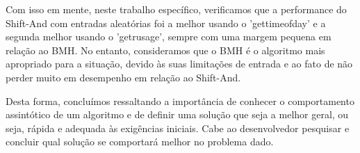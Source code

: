 \documentclass[12pt]{article}
\begin{document}
        Com isso em mente, neste trabalho específico, verificamos que a performance do Shift-And com entradas aleatórias foi a melhor usando o 
        'gettimeofday' e a segunda melhor usando o 'getrusage', sempre com uma margem pequena em relação ao BMH. No entanto, consideramos que o 
        BMH é o algoritmo mais apropriado para a situação, devido às suas limitações de entrada e ao fato de não perder muito em desempenho em 
        relação ao Shift-And.
        
        Desta forma, concluímos ressaltando a importância de conhecer o comportamento assintótico de um algoritmo e de definir uma solução que 
        seja a melhor geral, ou seja, rápida e adequada às exigências iniciais. Cabe ao desenvolvedor pesquisar e concluir qual solução se 
        comportará melhor no problema dado.
	\newpage
    \nocite{Cormen2012}

\end{document}
